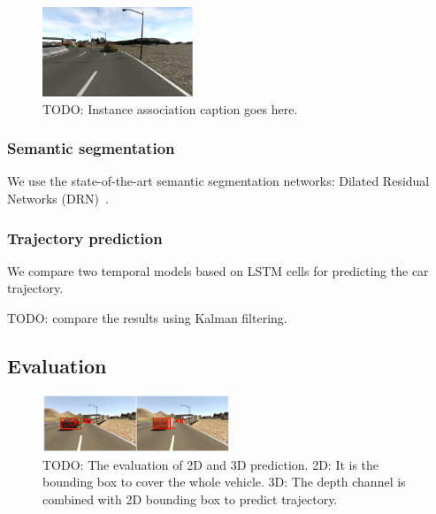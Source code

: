 \documentclass[10pt,twocolumn,letterpaper]{article}
\begin{document}
\begin{figure}[t]
        \centering
        \includegraphics[width=0.4\textwidth]{figures/double_detection.png}
        \caption{ {\small TODO: Instance association caption goes here.}}
        \label{fig:Instance_associationn}
\end{figure}


\subsubsection{Semantic segmentation}
We use the state-of-the-art semantic segmentation networks: Dilated Residual Networks (DRN)~\cite{yu2017dilated}.

\subsubsection{Trajectory prediction}

We compare two temporal models based on LSTM cells for predicting the car trajectory.

TODO: compare the results using Kalman filtering.



\subsection{Evaluation}
\begin{figure}[t]
        \centering
        \includegraphics[width=0.5\textwidth]{figures/evaluation.pdf}
        \caption{ {\small TODO: The evaluation of 2D and 3D prediction. 2D: It is the bounding box to cover the whole vehicle. 3D: The depth channel is combined with 2D bounding box to predict trajectory.}}
        \label{fig:evaluation}
\end{figure}
\end{document}
